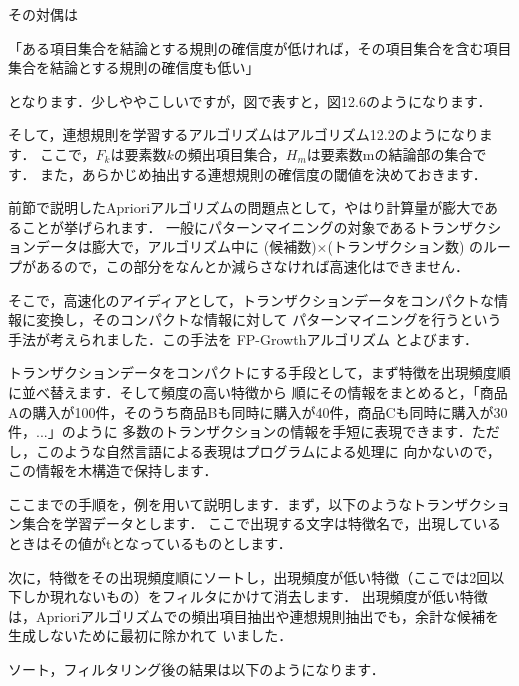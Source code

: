 その対偶は

「ある項目集合を結論とする規則の確信度が低ければ，その項目集合を含む項目集合を結論とする規則の確信度も低い」

となります．少しややこしいですが，図で表すと，図12.6のようになります．



そして，連想規則を学習するアルゴリズムはアルゴリズム12.2のようになります．
ここで，$F_k$は要素数$k$の頻出項目集合，$H_m$は要素数mの結論部の集合です．
また，あらかじめ抽出する連想規則の確信度の閾値を決めておきます．






前節で説明したAprioriアルゴリズムの問題点として，やはり計算量が膨大であることが挙げられます．
一般にパターンマイニングの対象であるトランザクションデータは膨大で，アルゴリズム中に
(候補数)×(トランザクション数) のループがあるので，この部分をなんとか減らさなければ高速化はできません．

そこで，高速化のアイディアとして，トランザクションデータをコンパクトな情報に変換し，そのコンパクトな情報に対して
パターンマイニングを行うという手法が考えられました．この手法を
FP-Growthアルゴリズム
とよびます．

トランザクションデータをコンパクトにする手段として，まず特徴を出現頻度順に並べ替えます．そして頻度の高い特徴から
順にその情報をまとめると，「商品Aの購入が100件，そのうち商品Bも同時に購入が40件，商品Cも同時に購入が30件，...」のように
多数のトランザクションの情報を手短に表現できます．ただし，このような自然言語による表現はプログラムによる処理に
向かないので，この情報を木構造で保持します．

ここまでの手順を，例を用いて説明します．まず，以下のようなトランザクション集合を学習データとします．
ここで出現する文字は特徴名で，出現しているときはその値がtとなっているものとします．


次に，特徴をその出現頻度順にソートし，出現頻度が低い特徴（ここでは2回以下しか現れないもの）をフィルタにかけて消去します．
出現頻度が低い特徴は，Aprioriアルゴリズムでの頻出項目抽出や連想規則抽出でも，余計な候補を生成しないために最初に除かれて
いました．

ソート，フィルタリング後の結果は以下のようになります．



